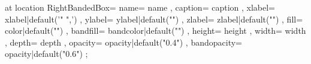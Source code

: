 \pic[shift={ {{- offset -}} }] at {{ location }} {
    RightBandedBox={
        name={{ name }},
        caption={{ caption }},
        xlabel={{ xlabel|default('{{" ",}}') }},
        ylabel={{ ylabel|default("") }},
        zlabel={{ zlabel|default("") }},
        fill={{ color|default("\ConvColor") }},
        bandfill={{ bandcolor|default("\ConvReluColor") }},
        height={{ height }},
        width={{ width }},
        depth={{ depth }},
        opacity={{ opacity|default("0.4") }},
        bandopacity={{ opacity|default("0.6") }}
    }
};
